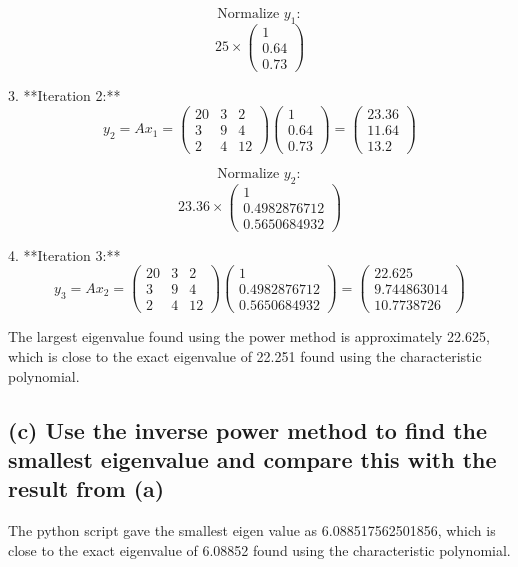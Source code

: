\documentclass{article}
\begin{document}
\[ \text{Normalize } y_1: \]
\[ 25 \times \begin{pmatrix} 1 \\ 0.64 \\ 0.73 \end{pmatrix} \]

3. **Iteration 2:**
\[ y_2 = Ax_1 = \begin{pmatrix} 20 & 3 & 2 \\ 3 & 9 & 4 \\ 2 & 4 & 12 \end{pmatrix} \begin{pmatrix} 1 \\ 0.64 \\ 0.73 \end{pmatrix} = \begin{pmatrix} 23.36 \\ 11.64 \\ 13.2 \end{pmatrix} \]

\[ \text{Normalize } y_2: \]
\[ 23.36 \times \begin{pmatrix} 1 \\ 0.4982876712 \\ 0.5650684932 \end{pmatrix} \]

4. **Iteration 3:**
\[ y_3 = Ax_2 = \begin{pmatrix} 20 & 3 & 2 \\ 3 & 9 & 4 \\ 2 & 4 & 12 \end{pmatrix} \begin{pmatrix} 1 \\ 0.4982876712 \\ 0.5650684932 \end{pmatrix} = \begin{pmatrix} 22.625 \\ 9.744863014 \\ 10.7738726 \end{pmatrix} \]

The largest eigenvalue found using the power method is approximately 22.625, which is close to the exact eigenvalue of 22.251 found using the characteristic polynomial.

\subsection*{(c) Use the inverse power method to find the smallest eigenvalue and compare this with the result from (a)}

The python script gave the smallest eigen value as 6.088517562501856, which is close to the exact eigenvalue of 6.08852 found using the characteristic polynomial.
\end{document}
